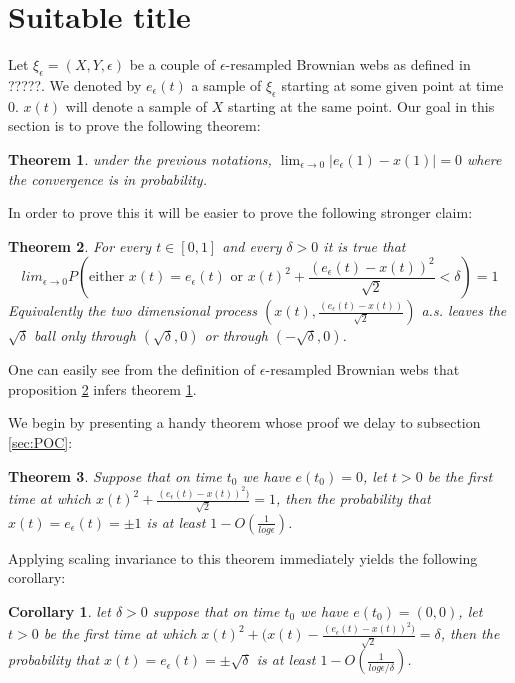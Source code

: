 \documentclass[11pt]{article}
\def \ds{\displaystyle}
\newtheorem{theorem}{Theorem}[section]
\newtheorem{cor}{Corollary}
\begin{document}
{
\section{Suitable title}
Let $\xi_\epsilon=(X,Y,\epsilon)$ be a couple of $\epsilon$-resampled 
Brownian webs as defined in ?????. We denoted by $e_\epsilon(t)$ a
sample of $\xi_\epsilon$ starting at some given point at time
$0$. $x(t)$ will denote a sample of $X$ starting at the same
point. Our goal in this section is to prove the following theorem:

\begin{theorem}\label{thm:main1}
under the previous notations, $\ds\lim_{\epsilon \rightarrow 0}
|e_\epsilon(1)- x(1)| = 0$ where the convergence is in probability.
\end{theorem}

In order to prove this it will be easier to prove the following
stronger claim:
\begin{theorem}\label{thm:main2}
For every $t\in[0,1]$ and every $\delta>0$ it is true that
$$\ds lim_{\epsilon \rightarrow 0}P\left(\text{either } x(t)=e_\epsilon(t)
\text{ or }x(t)^2+\frac{(e_\epsilon(t)-x(t))^2}{\sqrt2}<\delta\right)=1$$ 
Equivalently the two dimensional process $(x(t),\frac{(e_\epsilon(t)-x(t))}{\sqrt2})$ 
a.s. leaves the $\sqrt\delta$ ball only through 
$(\sqrt\delta,0)$ or through
$(-\sqrt\delta,0)$.
\end{theorem}

One can easily see from the definition of $\epsilon$-resampled
Brownian webs that proposition \ref{thm:main2} infers theorem
\ref{thm:main1}. 

 We begin by presenting a handy theorem whose proof
we delay to subsection \ref{sec:POC}:

\begin{theorem}\label{thm:no-escape}
Suppose that on time $t_0$ we have
$e(t_0)=0$, let $t>0$ be the first time at which
$x(t)^2+\frac{(e_\epsilon(t)-x(t))^2)}{\sqrt2}=1$, then the probability
that $x(t)=e_\epsilon(t)=\pm1$ is at least $1-O(\frac1{log\epsilon})$.
\end{theorem}

Applying scaling invariance to this theorem immediately yields the
following corollary:
\begin{cor}\label{cor:cor1}
let $\delta>0$ suppose that on time $t_0$ we have $e(t_0)=(0,0)$, let
$t>0$ be the first time at which
$x(t)^2+(x(t)-\frac{(e_\epsilon(t)-x(t))^2)}{\sqrt2}=\delta$, then the probability
that $x(t)=e_\epsilon(t)=\pm\sqrt\delta$ is at least
$1-O(\frac{1}{log\epsilon/\delta})$.
\end{cor}

}
\end{document}
